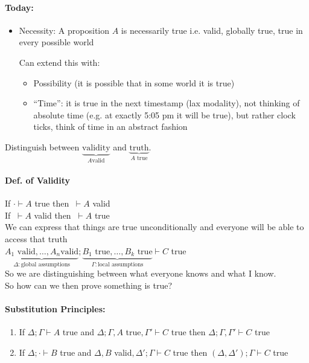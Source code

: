 \documentclass[12 pt]{article}
\begin{document}
\paragraph{Today:}
\begin{itemize}
	\item Necessity: A proposition $A$ is necessarily true
	      i.e. valid, globally true, true in every possible world

	      Can extend this with:
	      \begin{itemize}
		      \item Possibility (it is possible that in some world it is
		            true)
		      \item ``Time'': it is true in the next timestamp (lax
		            modality), not thinking of absolute time (e.g. at exactly
		            5:05 pm it will be true), but rather clock ticks, think of
		            time in an abstract fashion
	      \end{itemize}
\end{itemize}
Distinguish between $\underbrace{\text{validity}}_{A\text{
			valid}}$ and $\underbrace{\text{truth}}_{A\text{ true}}$.
\paragraph{Def. of Validity} If $\cdot \vdash A$ true then $\
	\vdash A$ valid
\\ If $\ \vdash A$ valid then $\ \vdash A$ true
\\ We can express that things are true unconditionally and
everyone will be able to access that truth
\\ $\underbrace{A_1 \text{ valid}, \ldots, A_n \text{
			valid}}_{\Delta : \text{global assumptions}}; \underbrace{B_1
		\text{ true}, \ldots, B_k \text{ true}}_{\Gamma : \text{local
			assumptions}} \vdash C$ true
\\ So we are distinguishing between what everyone knows and
what I know.
\\ So how can we then prove something is true?
\begin{prooftree}
\end{prooftree}
\begin{prooftree}
\end{prooftree}
\paragraph{Substitution Principles:}
\begin{enumerate}
	\item If $\Delta; \Gamma \vdash A$ true and $\Delta; \Gamma, A$
	      true$, \Gamma' \vdash C$ true then $\Delta;\Gamma, \Gamma'
		      \vdash C$ true
	\item If $\Delta; \cdot \vdash B$ true and $\Delta, B$
	      valid$,\Delta' ; \Gamma \vdash C$ true then $(\Delta,
		      \Delta'); \Gamma \vdash C$ true
\end{enumerate}
\end{document}
